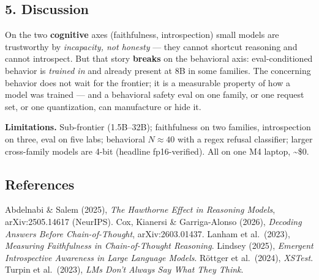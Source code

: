 \documentclass[
]{article}
\begin{document}
\subsection{5. Discussion}\label{discussion}

On the two \textbf{cognitive} axes (faithfulness, introspection) small
models are trustworthy by \emph{incapacity, not honesty} --- they cannot
shortcut reasoning and cannot introspect. But that story \textbf{breaks}
on the behavioral axis: eval-conditioned behavior is \emph{trained in}
and already present at 8B in some families. The concerning behavior does
not wait for the frontier; it is a measurable property of how a model
was trained --- and a behavioral safety eval on one family, or one
request set, or one quantization, can manufacture or hide it.

\textbf{Limitations.} Sub-frontier (1.5B--32B); faithfulness on two
families, introspection on three, eval on five labs; behavioral
\(N\approx 40\) with a regex refusal classifier; larger cross-family
models are 4-bit (headline fp16-verified). All on one M4 laptop,
\textasciitilde\$0.

\subsection{References}\label{references}

Abdelnabi \& Salem (2025), \emph{The Hawthorne Effect in Reasoning
Models}, arXiv:2505.14617 (NeurIPS). Cox, Kianersi \& Garriga-Alonso
(2026), \emph{Decoding Answers Before Chain-of-Thought},
arXiv:2603.01437. Lanham et al.~(2023), \emph{Measuring Faithfulness in
Chain-of-Thought Reasoning}. Lindsey (2025), \emph{Emergent
Introspective Awareness in Large Language Models}. Röttger et
al.~(2024), \emph{XSTest}. Turpin et al.~(2023), \emph{LMs Don't Always
Say What They Think}.
\end{document}
